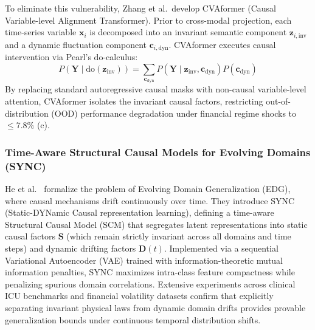 To eliminate this vulnerability, Zhang et al.\ develop CVAformer (Causal Variable-level Alignment Transformer). Prior to cross-modal projection, each time-series variable $\mathbf{x}_i$ is decomposed into an invariant semantic component $\mathbf{z}_{i, \text{inv}}$ and a dynamic fluctuation component $\mathbf{c}_{i, \text{dyn}}$. CVAformer executes causal intervention via Pearl's $\text{do}$-calculus:
\begin{equation}
    P(\mathbf{Y} \mid \text{do}(\mathbf{z}_{\text{inv}})) = \sum_{\mathbf{c}_{\text{dyn}}} P(\mathbf{Y} \mid \mathbf{z}_{\text{inv}}, \mathbf{c}_{\text{dyn}}) P(\mathbf{c}_{\text{dyn}})
\end{equation}
By replacing standard autoregressive causal masks with non-causal variable-level attention, CVAformer isolates the invariant causal factors, restricting out-of-distribution (OOD) performance degradation under financial regime shocks to $\le 7.8\%$ (c).

\subsubsection{Time-Aware Structural Causal Models for Evolving Domains (SYNC)}
He et al.~\cite{He2025SYNC} formalize the problem of Evolving Domain Generalization (EDG), where causal mechanisms drift continuously over time. They introduce SYNC (Static-DYNamic Causal representation learning), defining a time-aware Structural Causal Model (SCM) that segregates latent representations into static causal factors $\mathbf{S}$ (which remain strictly invariant across all domains and time steps) and dynamic drifting factors $\mathbf{D}(t)$. Implemented via a sequential Variational Autoencoder (VAE) trained with information-theoretic mutual information penalties, SYNC maximizes intra-class feature compactness while penalizing spurious domain correlations. Extensive experiments across clinical ICU benchmarks and financial volatility datasets confirm that explicitly separating invariant physical laws from dynamic domain drifts provides provable generalization bounds under continuous temporal distribution shifts.

